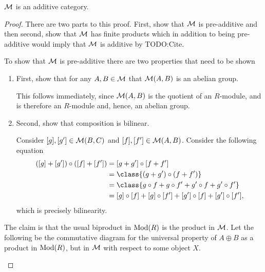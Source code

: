\begin{lemma}
    \( {\mathcal{M}} \) is an additive category.
\end{lemma}
\begin{proof}
    There are two parts to this proof. First, show that \( {\mathcal{M}} \) is pre-additive and then second, show that \( {\mathcal{M}} \) has finite products which in addition to being pre-additive would imply that \( {\mathcal{M}} \) is additive by TODO:Cite.

    To show that \( {\mathcal{M}} \) is pre-additive there are two properties that need to be shown
    \begin{enumerate}
        \item {
            First, show that for any \( A, B \in {\mathcal{M}} \) that \( {\mathcal{M}}(A, B) \) is an abelian group.

            This follows immediately, since \( {\mathcal{M}}(A, B) \) is the quotient of an \( R \)-module, and is therefore an \( R \)-module and, hence, an abelian group.
        }
        \item {
            Second, show that composition is bilinear.

            Consider \( [g], [g'] \in {\mathcal{M}}(B, C) \) and \( [f], [f'] \in {\mathcal{M}}(A, B) \). Consider the following equation
            \begin{align*}
                ([g] + [g']) \circ ([f] + [f']) &= [g + g'] \circ [f + f'] \\
                &= \class{(g + g') \circ (f + f')} \\
                &= \class{g \circ f + g \circ f' + g' \circ f + g' \circ f'} \\
                &= [g] \circ [f] + [g] \circ [f'] + [g'] \circ [f] + [g'] \circ [f'],
            \end{align*}
            which is precisely bilinearity.
        }
    \end{enumerate}

    The claim is that the usual biproduct in \( \operatorname{Mod}(R) \) is the product in \( {\mathcal{M}} \). Let the following be the commutative diagram for the universal property of \( A \oplus B \) as a product in \( \operatorname{Mod}(R) \), but in \( {\mathcal{M}} \) with respect to some object \( X \).
    \begin{center}
\end{center}
\end{proof}
